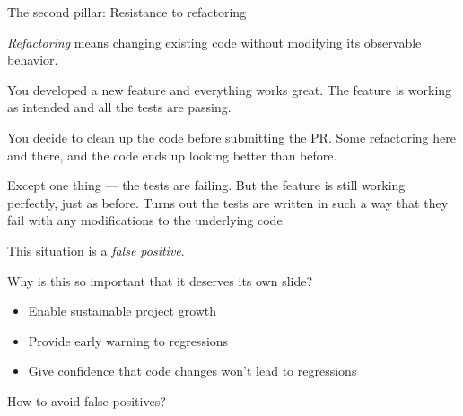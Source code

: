 \documentclass[english,handout,10pt,aspectratio=169,t]{beamer}
\begin{document}
\begin{frame}{The second pillar: Resistance to refactoring}
  \begin{minipage}{\linewidth}
    \textit{Refactoring} means changing existing code without modifying its
    observable behavior.
  \end{minipage}
  \vfill
  \begin{minipage}{\linewidth}
     You developed a new feature and everything works great. The
    feature is working as intended and all the tests are passing.

    \medskip
    
    You decide to clean up the code before submitting the PR. Some refactoring here
    and there, and the code ends up looking better than before.

    \medskip
    
    Except one thing --- the tests are failing. But the feature is still working
    perfectly, just as before. Turns out the tests are written in such a way that
    they fail with any modifications to the underlying code.

    \medskip

    This situation is a \textit{false positive}.
  \end{minipage}
  \vfill
  \begin{minipage}{\linewidth}
    Why is this so important that it deserves its own slide?

    \begin{itemize}
      \item Enable sustainable project growth
      \item Provide early warning to regressions
      \item Give confidence that code changes won't lead to regressions
    \end{itemize}
  \end{minipage}
\end{frame}

\begin{frame}{How to avoid false positives?}
\end{frame}
\end{document}

